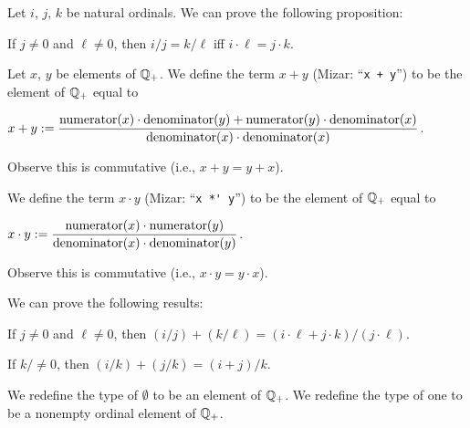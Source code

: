 \documentclass{article}
\begin{document}
Let $i$, $j$, $k$ be natural ordinals. We can prove the following proposition:
\begin{thm}
\item\label{arytm3:45} If $j\neq0$ and $\ell\neq0$, then $i/j=k/\ell$
  iff $i\cdot\ell=j\cdot k$.
\end{thm}

\begin{definition}
Let $x$, $y$ be elements of $\mathbb{Q}_{+}$.
We define the term $x + y$ (Mizar: ``\verb#x + y#'') to be the element of $\mathbb{Q}_{+}$ equal to
\begin{defn}
\item $\displaystyle{ x+y :=\frac{\operatorname{numerator}(x)\cdot\operatorname{denominator}(y)+\operatorname{numerator}(y)\cdot\operatorname{denominator}(x)}{\operatorname{denominator}(x)\cdot\operatorname{denominator}(x)}}$.
\end{defn}
Observe this is commutative (i.e., $x+y=y+x$).

We define the term $x\cdot y$ (Mizar: ``\verb#x *' y#'') to be the
element of $\mathbb{Q}_{+}$ equal to
\begin{defn}
\item $\displaystyle{x\cdot y :=\frac{\operatorname{numerator}(x)\cdot\operatorname{numerator}(y)}{\operatorname{denominator}(x)\cdot\operatorname{denominator}(y)}}$.
\end{defn}
Observe this is commutative (i.e., $x\cdot y=y\cdot x$).
\end{definition}

We can prove the following results:
\begin{thm}
\item\label{arytm3:46} If $j\neq0$ and $\ell\neq0$, then
  $(i/j)+(k/\ell)=(i\cdot\ell+j\cdot k)/(j\cdot\ell)$.
\item\label{arytm3:47} If $k/\neq0$, then $(i/k)+(j/k)=(i+j)/k$.
\end{thm}

\begin{definition}
We redefine the type of $\emptyset$ to be an element of $\mathbb{Q}_{+}$.
We redefine the type of one to be a nonempty ordinal element of $\mathbb{Q}_{+}$.
\end{definition}
\end{document}
